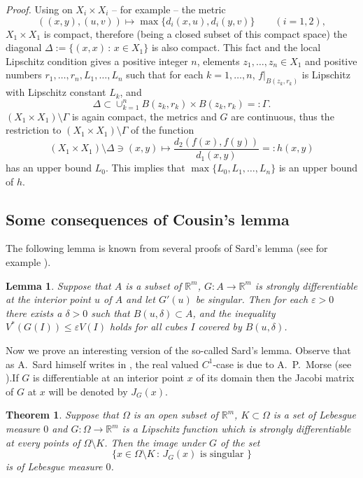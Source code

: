 \documentclass{article}
\newcommand{\proof}[1]{\textit{Proof. }#1}
\newtheorem{theorem}{Theorem}
\newtheorem{lemma}{Lemma}
\newcommand{\R}{\ensuremath{\mathbb R}}
\begin{document}
\proof{
Using on $X_i\times X_i$ -- for example -- the metric
\[((x,y),(u,v))\mapsto\max\{d_i(x,u),d_i(y,v)\}\qquad(i=1,2),\]
$X_1\times X_1$ is compact, therefore (being a closed subset of
this compact space) the diagonal $\Delta:=\{(x,x)\,:\,x\in X_1\}$
is also compact. This fact and the local Lipschitz condition gives
a positive integer $n$, elements $z_1,\ldots,z_n\in X_1$ and
positive numbers $r_1,\ldots,r_n,L_1,\ldots,L_n$ such that for
each $k=1,\ldots,n$, $f\vert_{B(z_k,r_k)}$ is Lipschitz with
Lipschitz constant $L_k$, and
\[\Delta\subset\cup_{k=1}^nB(z_k,r_k)\times B(z_k,r_k)=:\Gamma.\]
$(X_1\times X_1)\setminus\Gamma$ is again compact, the metrics and
$G$ are continuous, thus the restriction to $(X_1\times
X_1)\setminus\Gamma$ of the function
\[(X_1\times
X_1)\setminus\Delta\ni(x,y)\mapsto\frac{d_2(f(x),f(y))}{d_1(x,y)}=:h(x,y)\]
has an upper bound $L_0$. This implies that
$\max\{L_0,L_1,\ldots,L_n\}$ is an upper bound of $h$.
}%

\subsection{Some consequences of Cousin's lemma}

The following lemma is known from several proofs of Sard's lemma
(see for example \cite[proof of Theorem~3.14.]{Spivak:65}).

\begin{lemma}\label{lemmaSard}
Suppose that $A$ is a subset of $\R^m $, $G:A\to\R^m$ is strongly
differentiable at the interior point $u $ of $A$ and let $G'(u)$
be singular. Then for each $\varepsilon>0$ there exists a
$\delta>0$ such that $ B(u,\delta)\subset A$, and the inequality $
V^*(G(I))\le\varepsilon V(I)$ holds for all cubes $I$ covered by
$B(u,\delta)$.
\end{lemma}

Now we prove an interesting version of the so-called Sard's lemma.
Observe that as A.~Sard himself writes in \cite{Sard:42}, the real
valued $ C^1 $-case is due to A.~P.~Morse (see \cite{Morse:39}).If
$G$ is differentiable at an interior point $ x $ of its domain
then the Jacobi matrix of $G$ at $x$ will be denoted by $J_G(x)$.

\begin{theorem} \label{genofSard}
Suppose that $\Omega$ is an open subset of $\R^m$,
$K\subset\Omega$ is a set of Lebesgue measure $0 $ and
$G:\Omega\to\R^m$ is a Lipschitz function which is strongly
differentiable at every points of $\Omega\setminus K$. Then the
image under $ G $ of the set
\[\{x\in\Omega\setminus K\,:\,J_G(x)\mbox{ is singular }\}  \]
is of Lebesgue measure $ 0 $.
\end{theorem}
\end{document}

